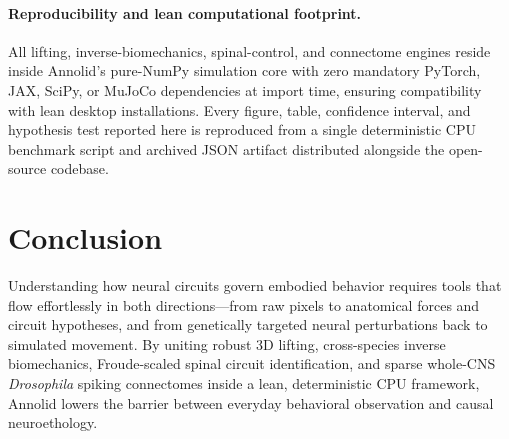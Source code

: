 \documentclass[10pt,twocolumn,letterpaper]{article}
\begin{document}
\paragraph{Reproducibility and lean computational footprint.}
All lifting, inverse-biomechanics, spinal-control, and connectome engines reside inside Annolid's pure-NumPy simulation core with zero mandatory PyTorch, JAX, SciPy, or MuJoCo dependencies at import time, ensuring compatibility with lean desktop installations. Every figure, table, confidence interval, and hypothesis test reported here is reproduced from a single deterministic CPU benchmark script and archived JSON artifact distributed alongside the open-source codebase.

\section{Conclusion}

Understanding how neural circuits govern embodied behavior requires tools that flow effortlessly in both directions---from raw pixels to anatomical forces and circuit hypotheses, and from genetically targeted neural perturbations back to simulated movement. By uniting robust 3D lifting, cross-species inverse biomechanics, Froude-scaled spinal circuit identification, and sparse whole-CNS \emph{Drosophila} spiking connectomes inside a lean, deterministic CPU framework, Annolid lowers the barrier between everyday behavioral observation and causal neuroethology.
\end{document}
